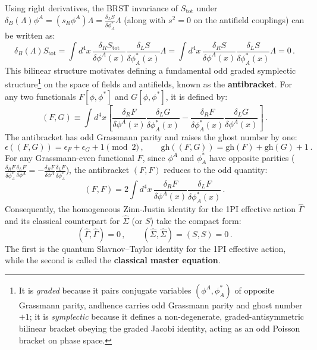 Using right derivatives, the BRST invariance of \(S_{\text{tot}}\) under \(\delta_B(\Lambda)\phi^A = (s_R\phi^A)\Lambda = \frac{\delta_L S}{\delta \phi_A^*}\Lambda\) (along with \(s^2 = 0\) on the antifield couplings) can be written as:
\begin{equation} \label{eq:bv_brst_invariance_chain}
    \delta_B(\Lambda) S_{\text{tot}} = \int d^4x \, \frac{\delta_R S_{\text{tot}}}{\delta \phi^A(x)} \frac{\delta_L S}{\delta \phi_A^*(x)} \Lambda = \int d^4x \, \frac{\delta_R S}{\delta \phi^A(x)} \frac{\delta_L S}{\delta \phi_A^*(x)} \Lambda = 0 \, .
\end{equation}
This bilinear structure motivates defining a fundamental odd graded symplectic structure\footnote{It is \textit{graded} because it pairs conjugate variables \((\phi^A, \phi_A^*)\) of opposite Grassmann parity, andhence carries odd Grassmann parity and ghost number \(+1\); it is \textit{symplectic} because it defines a non-degenerate, graded-antisymmetric bilinear bracket obeying the graded Jacobi identity, acting as an odd Poisson bracket on phase space.} on the space of fields and antifields, known as the \textbf{antibracket}. For any two functionals \(F[\phi, \phi^*]\) and \(G[\phi, \phi^*]\), it is defined by:
\begin{equation} \label{eq:antibracket_definition}
    (F, G) \equiv \int d^4x \left[ \frac{\delta_R F}{\delta \phi^A(x)} \frac{\delta_L G}{\delta \phi_A^*(x)} - \frac{\delta_R F}{\delta \phi_A^*(x)} \frac{\delta_L G}{\delta \phi^A(x)} \right] \, .
\end{equation}
The antibracket has odd Grassmann parity and raises the ghost number by one:
\begin{equation} \label{eq:antibracket_grading}
    \epsilon((F, G)) = \epsilon_F + \epsilon_G + 1 \pmod 2 \, , \qquad \text{gh}((F, G)) = \text{gh}(F) + \text{gh}(G) + 1 \, .
\end{equation}
For any Grassmann-even functional \(F\), since \(\phi^A\) and \(\phi_A^*\) have opposite parities (\(\frac{\delta_R F}{\delta \phi_A^*}\frac{\delta_L F}{\delta \phi^A} = -\frac{\delta_R F}{\delta \phi^A}\frac{\delta_L F}{\delta \phi_A^*}\)), the antibracket \((F, F)\) reduces to the odd quantity:
\begin{equation} \label{eq:antibracket_even_self}
    (F, F) = 2 \int d^4x \, \frac{\delta_R F}{\delta \phi^A(x)} \frac{\delta_L F}{\delta \phi_A^*(x)} \, .
\end{equation}
Consequently, the homogeneous Zinn-Justin identity for the 1PI effective action \(\widehat{\Gamma}\) and its classical counterpart for \(\widehat{\Sigma}\) (or \(S\)) take the compact form:
\begin{equation} \label{eq:master_equations_zj}
    (\widehat{\Gamma}, \widehat{\Gamma}) = 0 \, , \qquad \boxed{(\widehat{\Sigma}, \widehat{\Sigma}) = (S, S) = 0} \, .
\end{equation}
The first is the quantum Slavnov--Taylor identity for the 1PI effective action, while the second is called the \textbf{classical master equation}.

